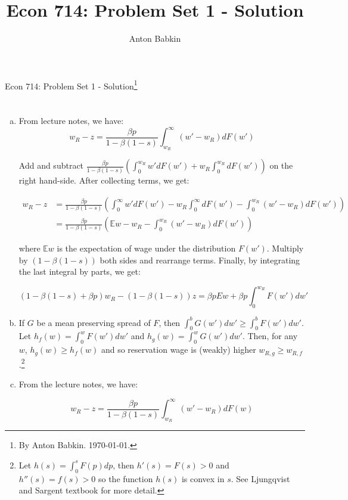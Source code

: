 \documentclass{article}
\title{Econ 714: Problem Set 1 - Solution}
\author{Anton Babkin}
\newcommand{\E}{\mathbb{E}}
\begin{document}
{\Large Econ 714: Problem Set 1 - Solution\footnote{By Anton Babkin. \today.}}


\section{}

\begin{enumerate}[(a)]
\item From lecture notes, we have:
  \begin{equation*}
    w_R-z=\frac{\beta p}{1-\beta(1-s)}\int_{w_R}^\infty(w'-w_R)dF(w')
  \end{equation*}

Add and subtract $\frac{\beta p}{1-\beta(1-s)}\left(
\int_0^{w_R}w'dF(w') + w_R\int_0^{w_R}dF(w')\right)$ on the right hand-side. After collecting terms, we get:

  \begin{align*}
    w_R-z&=\frac{\beta p}{1-\beta(1-s)}\left(\int_0^\infty w'dF(w') - w_R \int_0^\infty dF(w') - \int_0^{w_R} (w'-w_R)dF(w')\right)\\
         &=\frac{\beta p}{1-\beta(1-s)}\left(\E w-w_R-\int_0^{w_R} (w'-w_R)dF(w')\right)
  \end{align*}

  where $\E w$ is the expectation of wage under the distribution
  $F(w')$. Multiply by $(1-\beta(1-s))$ both sides and rearrange terms. Finally, by integrating the last integral by parts, we get:

\begin{equation}
(1-\beta(1-s)+\beta p)w_R - (1-\beta(1-s))z = \beta p Ew + \beta p \int_{0}^{w_R}F(w')dw'
\end{equation}

\item If $G$ be a mean preserving spread of $F$, then $\int_{0}^{b}G(w')dw' \geq \int_{0}^{b}F(w')dw'$. Let $h_f(w)=\int_{0}^{w}F(w')dw'$ and  $h_g(w)=\int_{0}^{w}G(w')dw'$. Then, for any $w$, $h_g(w) \geq h_f(w)$ and so reservation wage is (weakly) higher $w_{R,g} \geq w_{R,f}$.\footnote{Let $h(s)=\int_{0}^{s}F(p)dp$, then $h'(s)=F(s)>0$ and $h''(s)=f(s)>0$ so the function $h(s)$ is convex in $s$. See Ljungqvist and Sargent textbook for more detail.}


\item From the lecture notes, we have:

\begin{equation}
w_R - z = \frac{\beta p}{1-\beta(1-s)}\int_{w_R}^{\infty}(w'-w_R)dF(w) \nonumber
\end{equation}


\end{enumerate}
\end{document}

